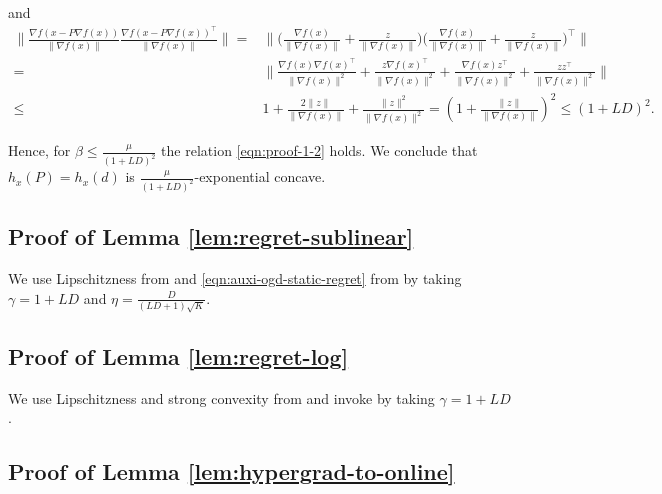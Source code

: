 and
\begin{align}
  \Big\| \tfrac{\nabla f (x - P \nabla f (x))}{\| \nabla f (x) \|}
  \tfrac{\nabla f (x - P \nabla f (x))^{\top}}{\| \nabla f (x) \|} \Big\| ={}
  & \Big\| \Big( \tfrac{\nabla f (x)}{\| \nabla f (x) \|} + \tfrac{z}{\|
  \nabla f (x) \|} \Big) \Big( \tfrac{\nabla f (x)}{\| \nabla f (x) \|} +
  \tfrac{z}{\| \nabla f (x) \|} \Big)^{\top} \Big\| \nonumber\\
  ={} & \big\| \tfrac{\nabla f (x) \nabla f (x)^{\top}}{\| \nabla f (x) \|^2} +
  \tfrac{z \nabla f (x)^{\top}}{\| \nabla f (x) \|^2} + \tfrac{\nabla f (x)
  z^{\top}}{\| \nabla f (x) \|^2} + \tfrac{z z^{\top}}{\| \nabla f (x) \|^2}
  \big\| \nonumber\\
  \leq{} & 1 + \tfrac{2 \| z \|}{\| \nabla f (x) \|} + \tfrac{\| z \|^2}{\|
  \nabla f (x) \|^2} = ( 1 + \tfrac{\| z \|}{\| \nabla f (x) \|}
  )^2 \leq (1 + L D)^2 . \nonumber
\end{align}

Hence, for $\beta \leq \tfrac{\mu}{(1 + L D)^2}$ the relation \eqref{eqn:proof-1-2} holds. We conclude that $h_x(P) = h_x(d)$ is $\frac{\mu}{(1 + L D)^2}$-exponential concave.

\subsection{Proof of Lemma \ref{lem:regret-sublinear}}

We use Lipschitzness from  and \eqref{eqn:auxi-ogd-static-regret} from  by taking $\gamma = 1+LD$ and $\eta = \frac{D}{(LD+1)\sqrt{K}}$.

\subsection{Proof of Lemma \ref{lem:regret-log}}
We use Lipschitzness and strong convexity from  and invoke  by taking $\gamma = 1 + L D$.

\subsection{Proof of Lemma \ref{lem:hypergrad-to-online}}

